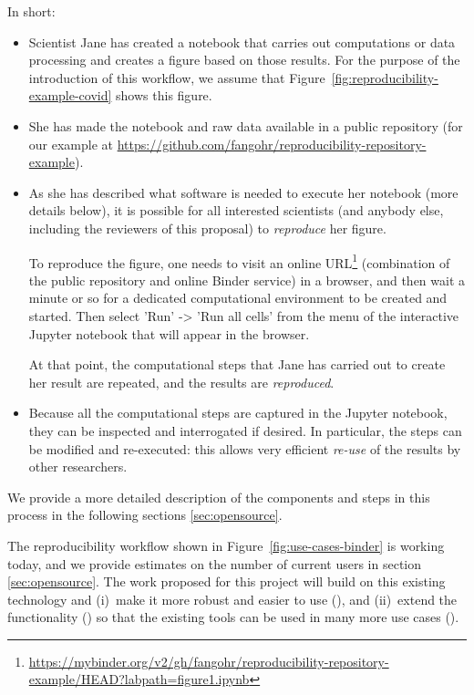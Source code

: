  In short:
\begin{itemize}
\item Scientist Jane has created a notebook that carries out computations or
  data processing and creates a figure based on those results. For the purpose
  of the introduction of this workflow, we assume that
  Figure~\ref{fig:reproducibility-example-covid} shows this figure.

\item She has made the notebook and raw data available in a public repository
  (for our example at\newline
  \mbox{\url{https://github.com/fangohr/reproducibility-repository-example}}).

\item As she has described what software is needed to execute her notebook (more
  details below), it is possible for all interested scientists (and anybody
  else, including the reviewers of this proposal) to \emph{reproduce} her
  figure.

  To reproduce the figure, one needs to visit an online URL\footnote{\url{https://mybinder.org/v2/gh/fangohr/reproducibility-repository-example/HEAD?labpath=figure1.ipynb}}
  (combination of the public repository and online Binder service) in a browser, and then wait a minute or so for a dedicated computational
  environment to be created and started. Then select 'Run' -> 'Run all cells'
  from the menu of the interactive Jupyter notebook that will appear in the
  browser.

  At that point, the computational steps that Jane has carried out to create her
  result are repeated, and the results are \emph{reproduced}.

\item Because all the computational steps are captured in the Jupyter notebook,
  they can be inspected and interrogated if desired. In particular, the steps
  can be modified and re-executed: this allows very efficient \emph{re-use} of
  the results by other researchers.
\end{itemize}

We provide a more detailed description of the components and steps in this
process in the following sections \ref{sec:opensource}.

The reproducibility workflow shown in Figure~\ref{fig:use-cases-binder} is
working today, and we provide estimates on the number of current users in
section \ref{sec:opensource}. The work proposed for this project will build on
this existing technology and (i)~make it more robust and easier to use
(), and (ii)~extend the functionality () so
that the existing tools can be used in many more use cases
().

